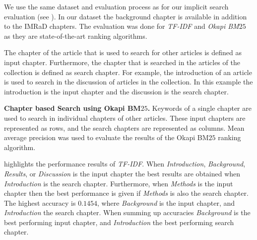 We use the same dataset and evaluation process as for our implicit search evaluation (see ). In our dataset the background chapter is available in addition to the IMRaD chapters. The evaluation was done for \textit{TF-IDF} and \textit{Okapi BM$25$} as they are state-of-the-art ranking algorithms.

The chapter of the article that is used to search for other articles is defined as input chapter. Furthermore, the chapter that is searched in the articles of the collection is defined as search chapter. For example, the introduction of an article is used to search in the discussion of articles in the collection. In this example the introduction is the input chapter and the discussion is the search chapter.

\begin{table}[b!]
\vrule{}\vrule
  \caption[Chapter based Search using Okapi BM$25$]{\textbf{Chapter based Search using Okapi BM$25$.} Keywords of a single chapter are used to search in individual chapters of other articles. These input chapters are represented as rows, and the search chapters are represented as columns. Mean average precision was used to evaluate the results of the Okapi BM$25$ ranking algorithm.}
  \label{tbl:chapter_based_okapi}
\end{table}

 highlights the performance results of \textit{TF-IDF}. When \textit{Introduction}, \textit{Background}, \textit{Results}, or \textit{Discussion} is the input chapter the best results are obtained when \textit{Introduction} is the search chapter. Furthermore, when \textit{Methods} is the input chapter then the best performance is given if \textit{Methods} is also the search chapter. The highest accuracy is $0.1454$, where \textit{Background} is the input chapter, and \textit{Introduction} the search chapter. When summing up accuracies \textit{Background} is the best performing input chapter, and \textit{Introduction} the best performing search chapter.

